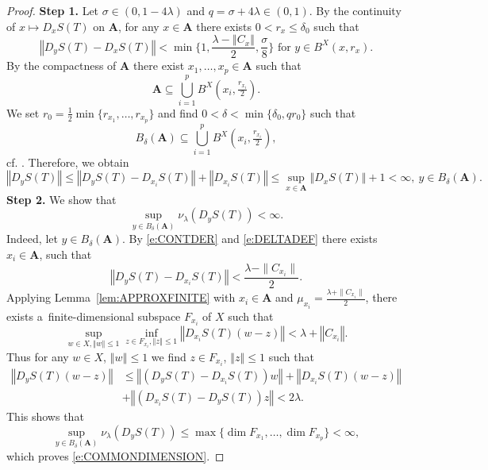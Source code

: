 \documentclass[a4paper,12pt,reqno]{amsart}
\theoremstyle{plain}
\theoremstyle{definition}
\numberwithin{equation}{section}
\newcommand{\norm}[1]{\left\Vert#1\right\Vert}
\renewcommand{\leq}{\leqslant}
\begin{document}
\begin{proof}
\textbf{Step 1.} 
Let $\sigma\in(0,1-4\lambda)$ and $q=\sigma+4\lambda\in(0,1)$. By the continuity of $x\mapsto D_xS(T)$ on $\mathbf{A}$, for any $x\in\mathbf{A}$ there exists $0<r_x\leq\delta_0$ such that
\begin{equation}\label{e:CONTDER}
\norm{D_yS(T)-D_xS(T)}<\min\Big\{1,\frac{\lambda-\norm{C_x}}{2},\frac{\sigma}{8}\Big\}\text{ for }y\in B^{X}(x,r_x).
\end{equation}
By the compactness of $\mathbf{A}$ there exist $x_1,\ldots,x_p\in\mathbf{A}$ such that 
$$\mathbf{A}\subseteq\bigcup_{i=1}^{p}B^{X}(x_i,\tfrac{r_{x_i}}{2}).$$
We set $r_0=\frac{1}{2}\min\{r_{x_1},\ldots,r_{x_p}\}$ and find $0<\delta<\min\{\delta_0,qr_0\}$ such that
\begin{equation}\label{e:DELTADEF}
B_{\delta}(\mathbf{A})\subseteq\bigcup_{i=1}^{p}B^{X}(x_i,\tfrac{r_{x_i}}{2}),
\end{equation}
cf. \cite[Lemma 2.3]{ZZ12}. Therefore, we obtain
\begin{equation*}
\norm{D_yS(T)}\leq\norm{D_yS(T)-D_{x_i}S(T)}+\norm{D_{x_i}S(T)}\leq\sup_{x\in\mathbf{A}}\norm{D_xS(T)}+1<\infty,\ y\in B_\delta(\mathbf{A}).
\end{equation*}
\textbf{Step 2.} We show that
\begin{equation}\label{e:COMMONDIMENSION}
\sup\limits_{y\in B_{\delta}(\mathbf{A})}\nu_{\lambda}(D_y S(T))<\infty.
\end{equation}
Indeed, let $y\in B_{\delta}(\mathbf{A})$. By \eqref{e:CONTDER} and \eqref{e:DELTADEF} there exists $x_i\in\mathbf{A}$, such that
$$\norm{D_yS(T)-D_{x_i}S(T)}<\frac{\lambda-\|C_{x_i}\|}{2}.$$
Applying Lemma~\ref{lem:APPROXFINITE} with $x_i\in\mathbf{A}$ and $\mu_{x_i}=\frac{\lambda+\|C_{x_i}\|}{2}$, 
there exists a~finite-dimensional subspace $F_{x_i}$ of $X$ such that
\begin{equation*}
\sup_{w\in X, \norm{w}\leq 1}\inf_{z\in F_{x_i}, \norm{z}\leq 1}\norm{D_{x_i} S(T)(w-z)}<\lambda+\norm{C_{x_i}}. 
\end{equation*}
Thus for any $w\in X$, $\norm{w}\leq 1$ we find $z\in F_{x_i}$, $\norm{z}\leq 1$ such that
\begin{equation*}
\begin{split}
\norm{D_y S(T)(w-z)}&\leq\norm{(D_y S(T) -D_{x_i} S(T)) w}+\norm{D_{x_i} S(T) (w-z)}\\
&+\norm{(D_{x_i} S(T)-D_yS(T))z}<2\lambda.
\end{split}
\end{equation*}
This shows that 
$$\sup_{y\in B_{\delta}(\mathbf{A})}\nu_{\lambda}(D_y S(T))\leq\max\{\dim F_{x_1},\ldots,\dim F_{x_p}\}<\infty,$$
which proves \eqref{e:COMMONDIMENSION}.


\end{proof}
\end{document}
